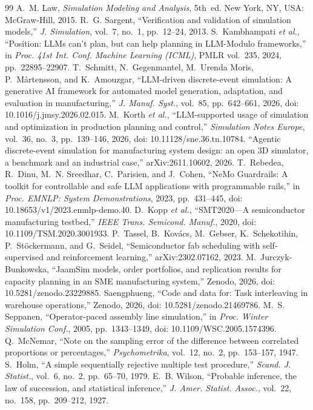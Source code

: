 \documentclass[conference]{IEEEtran}
\begin{document}
\begin{thebibliography}{99}
 A.~M. Law, \emph{Simulation Modeling and Analysis}, 5th~ed. New York, NY, USA: McGraw-Hill, 2015.
 R.~G. Sargent, ``Verification and validation of simulation models,'' \emph{J. Simulation}, vol.~7, no.~1, pp.~12--24, 2013.
 S.~Kambhampati \emph{et al.}, ``Position: LLMs can't plan, but can help planning in LLM-Modulo frameworks,'' in \emph{Proc. 41st Int. Conf. Machine Learning (ICML)}, PMLR vol.~235, 2024, pp.~22895--22907.
 T.~Schmitt, N.~Gegenmantel, M.~Urenda Moris, P.~M{\aa}rtensson, and K.~Amouzgar, ``LLM-driven discrete-event simulation: A generative AI framework for automated model generation, adaptation, and evaluation in manufacturing,'' \emph{J. Manuf. Syst.}, vol.~85, pp.~642--661, 2026, doi: 10.1016/j.jmsy.2026.02.015.
 M.~Korth \emph{et al.}, ``LLM-supported usage of simulation and optimization in production planning and control,'' \emph{Simulation Notes Europe}, vol.~36, no.~3, pp.~139--146, 2026, doi: 10.11128/sne.36.tn.10784.
 ``Agentic discrete-event simulation for manufacturing system design: an open 3D simulator, a benchmark and an industrial case,'' arXiv:2611.10602, 2026.
 T.~Rebedea, R.~Dinu, M.~N. Sreedhar, C.~Parisien, and J.~Cohen, ``NeMo Guardrails: A toolkit for controllable and safe LLM applications with programmable rails,'' in \emph{Proc. EMNLP: System Demonstrations}, 2023, pp.~431--445, doi: 10.18653/v1/2023.emnlp-demo.40.
 D.~Kopp \emph{et al.}, ``SMT2020---A semiconductor manufacturing testbed,'' \emph{IEEE Trans. Semicond. Manuf.}, 2020, doi: 10.1109/TSM.2020.3001933.
 P.~Tassel, B.~Kov{\'a}cs, M.~Gebser, K.~Schekotihin, P.~St{\"o}ckermann, and G.~Seidel, ``Semiconductor fab scheduling with self-supervised and reinforcement learning,'' arXiv:2302.07162, 2023.
 M.~Jurczyk-Bunkowska, ``JaamSim models, order portfolios, and replication results for capacity planning in an SME manufacturing system,'' Zenodo, 2026, doi: 10.5281/zenodo.23229885.
 Saengphueng, ``Code and data for: Task interleaving in warehouse operations,'' Zenodo, 2026, doi: 10.5281/zenodo.21469786.
 M.~S. Seppanen, ``Operator-paced assembly line simulation,'' in \emph{Proc. Winter Simulation Conf.}, 2005, pp.~1343--1349, doi: 10.1109/WSC.2005.1574396.
 Q.~McNemar, ``Note on the sampling error of the difference between correlated proportions or percentages,'' \emph{Psychometrika}, vol.~12, no.~2, pp.~153--157, 1947.
 S.~Holm, ``A simple sequentially rejective multiple test procedure,'' \emph{Scand. J. Statist.}, vol.~6, no.~2, pp.~65--70, 1979.
 E.~B. Wilson, ``Probable inference, the law of succession, and statistical inference,'' \emph{J. Amer. Statist. Assoc.}, vol.~22, no.~158, pp.~209--212, 1927.
\end{thebibliography}
\end{document}
